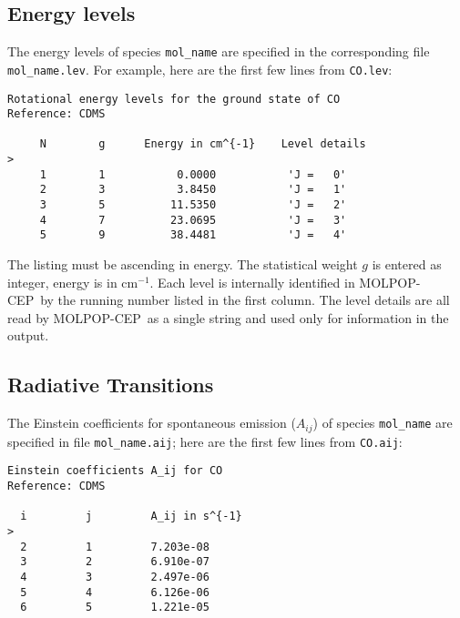 \documentclass[12pt]{article}
\def\M{MOLPOP-CEP}
\begin{document}
\subsection{Energy levels}
The energy levels of species \texttt{mol\_name} are specified in the
corresponding file \texttt{mol\_name.lev}.  For example, here are the first few
lines from \texttt{CO.lev}:

\newpage

\begin{verbatim}
Rotational energy levels for the ground state of CO
Reference: CDMS

     N        g      Energy in cm^{-1}    Level details
>
     1        1           0.0000           'J =   0'
     2        3           3.8450           'J =   1'
     3        5          11.5350           'J =   2'
     4        7          23.0695           'J =   3'
     5        9          38.4481           'J =   4'
\end{verbatim}
The listing must be ascending in energy.  The statistical weight $g$ is entered
as integer, energy is in cm$^{-1}$. Each level is internally identified in \M\
by the running number listed in the first column. The level details are all
read by \M\ as a single string and used only for information in the output.

\subsection{Radiative Transitions}
The Einstein coefficients for spontaneous emission ($A_{ij}$) of species
\texttt{mol\_name} are specified in file \texttt{mol\_name.aij}; here are the
first few lines from \texttt{CO.aij}:
\begin{verbatim}
Einstein coefficients A_ij for CO
Reference: CDMS

  i         j         A_ij in s^{-1}
>
  2         1         7.203e-08
  3         2         6.910e-07
  4         3         2.497e-06
  5         4         6.126e-06
  6         5         1.221e-05
 \end{verbatim}
\end{document}
